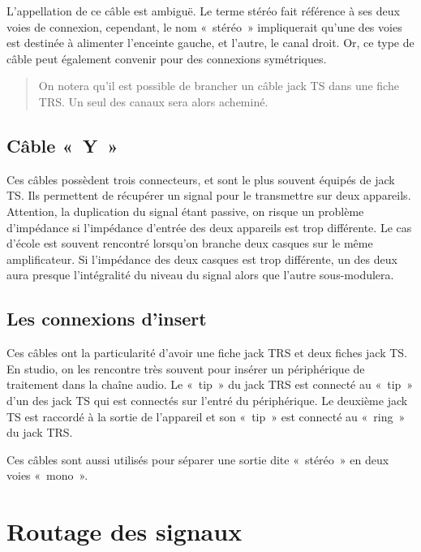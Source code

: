 \documentclass[
]{book}
\begin{document}
L'appellation de ce câble est ambiguë. Le terme stéréo fait référence à ses deux voies de connexion, cependant, le nom «~stéréo~» impliquerait qu'une des voies est destinée à alimenter l'enceinte gauche, et l'autre, le canal droit. Or, ce type de câble peut également convenir pour des connexions symétriques.

\begin{quote}
On notera qu'il est possible de brancher un câble jack TS dans une fiche TRS. Un seul des canaux sera alors acheminé.
\end{quote}

\hypertarget{cuxe2ble-y}{%
\subsection{Câble «~Y~»}\label{cuxe2ble-y}}

Ces câbles possèdent trois connecteurs, et sont le plus souvent équipés de jack TS. Ils permettent de récupérer un signal pour le transmettre sur deux appareils. Attention, la duplication du signal étant passive, on risque un problème d'impédance si l'impédance d'entrée des deux appareils est trop différente. Le cas d'école est souvent rencontré lorsqu'on branche deux casques sur le même amplificateur. Si l'impédance des deux casques est trop différente, un des deux aura presque l'intégralité du niveau du signal alors que l'autre sous-modulera.

\hypertarget{les-connexions-dinsert}{%
\subsection{Les connexions d'insert}\label{les-connexions-dinsert}}

Ces câbles ont la particularité d'avoir une fiche jack TRS et deux fiches jack TS. En studio, on les rencontre très souvent pour insérer un périphérique de traitement dans la chaîne audio. Le «~tip~» du jack TRS est connecté au «~tip~» d'un des jack TS qui est connectés sur l'entré du périphérique. Le deuxième jack TS est raccordé à la sortie de l'appareil et son «~tip~» est connecté au «~ring~» du jack TRS.

Ces câbles sont aussi utilisés pour séparer une sortie dite «~stéréo~» en deux voies «~mono~».

\hypertarget{routage-des-signaux}{%
\section{Routage des signaux}\label{routage-des-signaux}}
\end{document}
